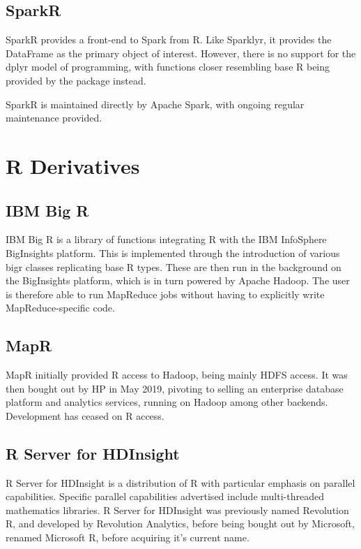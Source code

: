 \documentclass[10pt,a4paper]{article}
\begin{document}
\subsection{SparkR}
\label{sec:sparkr}
\nocite{venkataraman20:_spark}
SparkR provides a front-end to Spark from R. Like Sparklyr, it
provides the DataFrame as the primary object of interest. However,
there is no support for the dplyr model of programming, with functions
closer resembling base R being provided by the package instead.

SparkR is maintained directly by Apache Spark, with ongoing regular
maintenance provided.

\section{R Derivatives}
\label{sec:r-derivatives}

\subsection{IBM Big R}
\label{sec:ibm-big-r}
\nocite{inc.14:_infos_bigin_big_r}
IBM Big R is a library of functions integrating R with the IBM
InfoSphere BigInsights platform. This is implemented through the
introduction of various bigr classes replicating base R types. These
are then run in the background on the BigInsights platform, which is
in turn powered by Apache Hadoop. The user is therefore able to run
MapReduce jobs without having to explicitly write MapReduce-specific
code.

\subsection{MapR}
\label{sec:mapr}
\nocite{mapr19:_indus_next_gener_data_platf_ai_analy}
MapR initially provided R access to Hadoop, being mainly HDFS access.
It was then bought out by HP in May 2019, pivoting to selling an
enterprise database platform and analytics services, running on Hadoop
among other backends. Development has ceased on R access.

\subsection{R Server for HDInsight}
\label{sec:r-server-hdinsight}
\nocite{azure16:_r_server_hdins_r_analy}
R Server for HDInsight is a distribution of R with particular emphasis
on parallel capabilities. Specific parallel capabilities advertised
include multi-threaded mathematics libraries. R Server for HDInsight
was previously named Revolution R, and developed by Revolution
Analytics, before being bought out by Microsoft, renamed Microsoft R,
before acquiring it's current name.
\printbibheading{}
\printbibliography[keyword=hadoop, title={Hadoop}]
\printbibliography[keyword=spark,title={Spark}]
\printbibliography[keyword=h2o,title=H2O]
\printbibliography[keyword=rpackage,title={R Packages}]
\printbibliography[keyword=rderiv,title={R Derivatives}]
\printbibliography[filter=other,title=Other]
\end{document}
